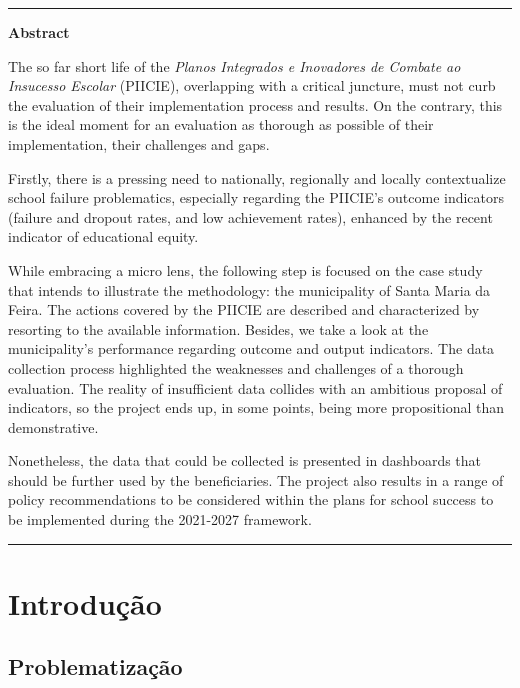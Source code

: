 \documentclass[
]{book}
\begin{document}
\begin{center}\rule{0.5\linewidth}{0.5pt}\end{center}

\textbf{Abstract}

The so far short life of the \emph{Planos Integrados e Inovadores de Combate ao Insucesso Escolar} (PIICIE), overlapping with a critical juncture, must not curb the evaluation of their implementation process and results. On the contrary, this is the ideal moment for an evaluation as thorough as possible of their implementation, their challenges and gaps.

Firstly, there is a pressing need to nationally, regionally and locally contextualize school failure problematics, especially regarding the PIICIE's outcome indicators (failure and dropout rates, and low achievement rates), enhanced by the recent indicator of educational equity.

While embracing a micro lens, the following step is focused on the case study that intends to illustrate the methodology: the municipality of Santa Maria da Feira. The actions covered by the PIICIE are described and characterized by resorting to the available information. Besides, we take a look at the municipality's performance regarding outcome and output indicators. The data collection process highlighted the weaknesses and challenges of a thorough evaluation. The reality of insufficient data collides with an ambitious proposal of indicators, so the project ends up, in some points, being more propositional than demonstrative.

Nonetheless, the data that could be collected is presented in dashboards that should be further used by the beneficiaries. The project also results in a range of policy recommendations to be considered within the plans for school success to be implemented during the 2021-2027 framework.

\begin{center}\rule{0.5\linewidth}{0.5pt}\end{center}

\hypertarget{introduuxe7uxe3o}{%
\chapter{\texorpdfstring{\textbf{Introdução}}{Introdução}}\label{introduuxe7uxe3o}}

\hypertarget{problematizauxe7uxe3o}{%
\section{\texorpdfstring{\textbf{Problematização}}{Problematização}}\label{problematizauxe7uxe3o}}
\end{document}
